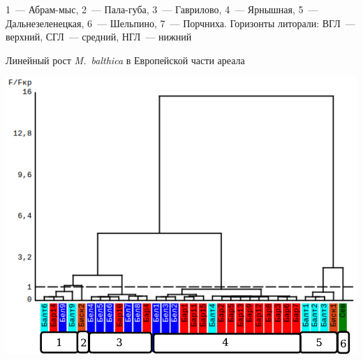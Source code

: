 \documentclass{beamer}
\begin{document}
\begin{frame}
\begin{minipage}[t]{.49\linewidth}
\begin{center}
			\end{center}
		\end{minipage}
\tiny{1~--- Абрам-мыс, 2~--- Пала-губа, 3~--- Гаврилово, 4~--- Ярнышная, 5~--- Дальнезеленецкая, 6~--- Шельпино, 7~--- Порчниха.
Горизонты литорали: ВГЛ~--- верхний, СГЛ~--- средний, НГЛ~--- нижний}
\end{frame}


\begin{frame}{Линейный рост {\it M.~balthica} в Европейской части ареала}
	\begin{minipage}[t]{.52\linewidth}
		\begin{center}
			\includegraphics[width=\textwidth]{./Europe_clusters_usrednenie.pdf}
		\end{center}


\end{minipage}
\end{frame}
\end{document}
